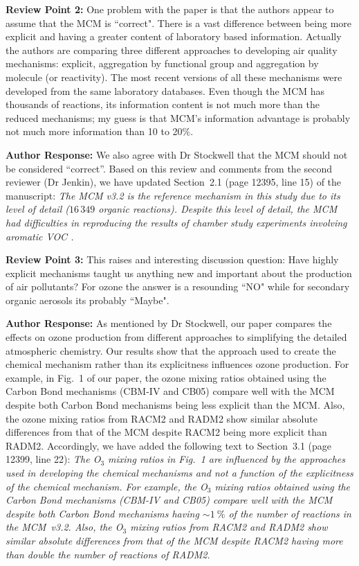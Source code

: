 \documentclass{article}
\begin{document}
\textbf{Review Point 2: } One problem with the paper is that the authors appear to assume that the MCM is ``correct". There is a vast difference between being more explicit and having a greater content of laboratory based information. Actually the authors are comparing three different approaches to developing air quality mechanisms: explicit, aggregation by functional group and aggregation by molecule (or reactivity). The most recent versions of all these mechanisms were developed from the same laboratory databases. Even though the MCM has thousands of reactions, its information content is not much more than the reduced mechanisms; my guess is that MCM’s information advantage is probably not much more information than 10 to 20\%.

\textbf{Author Response:}
We also agree with Dr Stockwell that the MCM should not be considered ``correct''. Based on this review and comments from the second reviewer (Dr Jenkin), we have updated Section~2.1 (page 12395, line 15) of the manuscript: \textit{The MCM v3.2 is the reference mechanism in this study due to its level of detail ($16\,349$ organic reactions). Despite this level of detail, the MCM had difficulties in reproducing the results of chamber study experiments involving aromatic VOC \citep{Bloss:2005}.}

\textbf{Review Point 3: } This raises and interesting discussion question: Have highly explicit mechanisms taught us anything new and important about the production of air pollutants? For ozone the answer is a resounding ``NO" while for secondary organic aerosols its probably ``Maybe".

\textbf{Author Response:}
As mentioned by Dr Stockwell, our paper compares the effects on ozone production from different approaches to simplifying the detailed atmospheric chemistry.
Our results show that the approach used to create the chemical mechanism rather than its explicitness influences ozone production.
For example, in Fig.~1 of our paper, the ozone mixing ratios obtained using the Carbon Bond mechanisms (CBM-IV and CB05) compare well with the MCM despite both Carbon Bond mechanisms being less explicit than the MCM.
Also, the ozone mixing ratios from RACM2 and RADM2 show similar absolute differences from that of the MCM despite RACM2 being more explicit than RADM2.
Accordingly, we have added the following text to Section~3.1 (page 12399, line 22):
\textit{The O$_3$ mixing ratios in Fig.~1 are influenced by the approaches used in developing the chemical mechanisms and not a function of the explicitness of the chemical mechanism.  For example, the O$_3$ mixing ratios obtained using the Carbon Bond mechanisms (CBM-IV and CB05) compare well with the MCM despite both Carbon Bond mechanisms having $\sim1~\%$ of the number of reactions in the MCM~v3.2.  Also, the O$_3$ mixing ratios from RACM2 and RADM2 show similar absolute differences from that of the MCM despite RACM2 having more than double the number of reactions of RADM2.}
\end{document}
